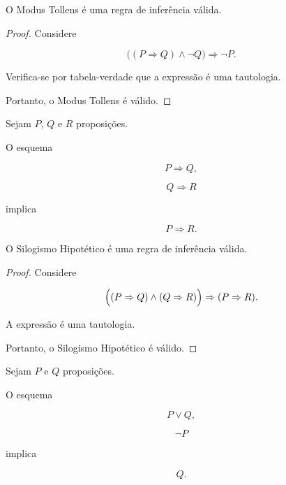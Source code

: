 \documentclass[../../main]{subfiles}
\begin{document}
\begin{prop}
	\label{prop:matematica:logica-matematica:regras-de-inferencia:validade-modus-tollens}

	O Modus Tollens é uma regra de inferência válida.
\end{prop}

\begin{proof}

	Considere

	\[
		\bigl(
		(P \Rightarrow Q)
		\land
		\neg Q
		\bigr)
		\Rightarrow
		\neg P.
	\]

	Verifica-se por tabela-verdade que a expressão é uma tautologia.

	Portanto, o Modus Tollens é válido.

\end{proof}

\begin{defn}
	\label{def:matematica:logica-matematica:regras-de-inferencia:silogismo-hipotetico}

	Sejam \(P\), \(Q\) e \(R\) proposições.

	O esquema

	\[
		P \Rightarrow Q,
	\]

	\[
		Q \Rightarrow R
	\]

	implica

	\[
		P \Rightarrow R.
	\]

\end{defn}

\begin{prop}
	\label{prop:matematica:logica-matematica:regras-de-inferencia:validade-silogismo-hipotetico}

	O Silogismo Hipotético é uma regra de inferência válida.
\end{prop}

\begin{proof}

	Considere

	\[
		\Bigl(
		(P \Rightarrow Q)
		\land
		(Q \Rightarrow R)
		\Bigr)
		\Rightarrow
		(P \Rightarrow R).
	\]

	A expressão é uma tautologia.

	Portanto, o Silogismo Hipotético é válido.

\end{proof}

\begin{defn}
	\label{def:matematica:logica-matematica:regras-de-inferencia:silogismo-disjuntivo}

	Sejam \(P\) e \(Q\) proposições.

	O esquema

	\[
		P \lor Q,
	\]

	\[
		\neg P
	\]

	implica

	\[
		Q.
	\]

\end{defn}
\end{document}
